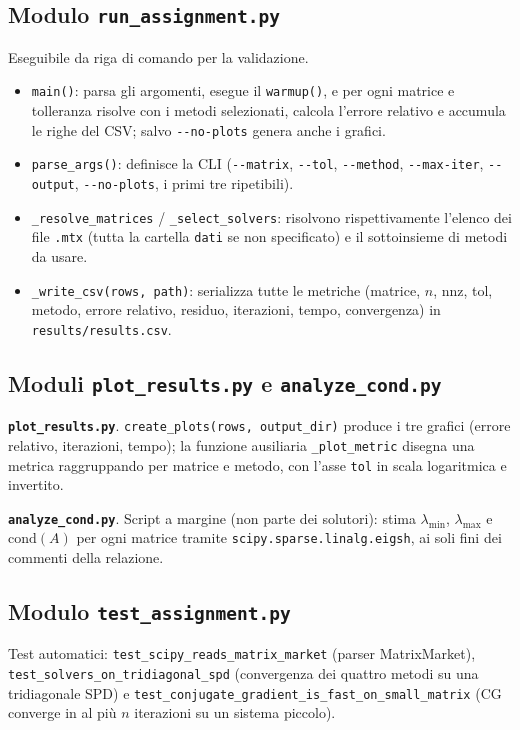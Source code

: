 \documentclass[11pt,a4paper]{article}
\begin{document}
\subsection{Modulo \texttt{run\_assignment.py}}
Eseguibile da riga di comando per la validazione.
\begin{itemize}[leftmargin=1.6em]
  \item \texttt{main()}: parsa gli argomenti, esegue il \texttt{warmup()}, e per
  ogni matrice e tolleranza risolve con i metodi selezionati, calcola l'errore
  relativo e accumula le righe del CSV; salvo \texttt{-{}-no-plots} genera anche i
  grafici.
  \item \texttt{parse\_args()}: definisce la CLI (\texttt{-{}-matrix},
  \texttt{-{}-tol}, \texttt{-{}-method}, \texttt{-{}-max-iter},
  \texttt{-{}-output}, \texttt{-{}-no-plots}, i primi tre ripetibili).
  \item \texttt{\_resolve\_matrices} / \texttt{\_select\_solvers}: risolvono
  rispettivamente l'elenco dei file \texttt{.mtx} (tutta la cartella \texttt{dati}
  se non specificato) e il sottoinsieme di metodi da usare.
  \item \texttt{\_write\_csv(rows, path)}: serializza tutte le metriche
  (matrice, $n$, nnz, tol, metodo, errore relativo, residuo, iterazioni, tempo,
  convergenza) in \texttt{results/results.csv}.
\end{itemize}

\subsection{Moduli \texttt{plot\_results.py} e \texttt{analyze\_cond.py}}
\noindent\textbf{\texttt{plot\_results.py}}. \texttt{create\_plots(rows,
output\_dir)} produce i tre grafici (errore relativo, iterazioni, tempo); la
funzione ausiliaria \texttt{\_plot\_metric} disegna una metrica raggruppando per
matrice e metodo, con l'asse \texttt{tol} in scala logaritmica e invertito.

\noindent\textbf{\texttt{analyze\_cond.py}}. Script a margine (non parte dei
solutori): stima $\lambda_{\min}$, $\lambda_{\max}$ e $\mathrm{cond}(A)$ per ogni
matrice tramite \texttt{scipy.sparse.linalg.eigsh}, ai soli fini dei commenti
della relazione.

\subsection{Modulo \texttt{test\_assignment.py}}
Test automatici: \texttt{test\_scipy\_reads\_matrix\_market} (parser
MatrixMarket), \texttt{test\_solvers\_on\_tridiagonal\_spd} (convergenza dei
quattro metodi su una tridiagonale SPD) e
\texttt{test\_conjugate\_gradient\_is\_fast\_on\_small\_matrix} (CG converge in al
più $n$ iterazioni su un sistema piccolo).
\end{document}
